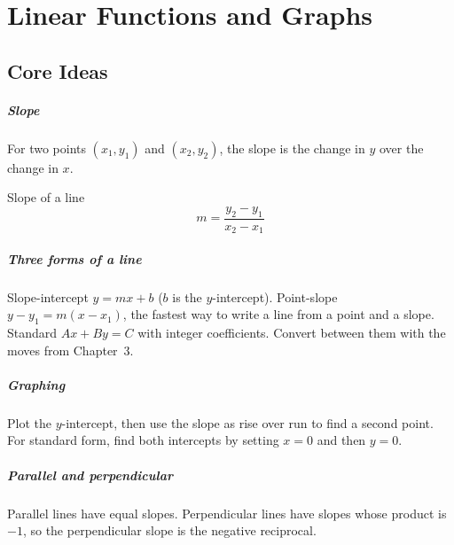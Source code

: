 \chapter{Linear Functions and Graphs}


\section{Core Ideas}

\paragraph{Slope} For two points $(x_1, y_1)$ and $(x_2, y_2)$, the slope is the change in $y$ over the change in $x$.

\begin{keybox}{Slope of a line}
\[
m = \frac{y_2 - y_1}{x_2 - x_1}
\]
\end{keybox}

\paragraph{Three forms of a line} Slope-intercept $y = mx + b$ ($b$ is the $y$-intercept). Point-slope $y - y_1 = m(x - x_1)$, the fastest way to write a line from a point and a slope. Standard $Ax + By = C$ with integer coefficients. Convert between them with the moves from Chapter~3.

\paragraph{Graphing} Plot the $y$-intercept, then use the slope as rise over run to find a second point. For standard form, find both intercepts by setting $x = 0$ and then $y = 0$.

\paragraph{Parallel and perpendicular} Parallel lines have equal slopes. Perpendicular lines have slopes whose product is $-1$, so the perpendicular slope is the negative reciprocal.

